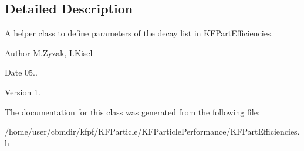 \subsection{Detailed Description}
A helper class to define parameters of the decay list in \hyperlink{classKFPartEfficiencies}{K\+F\+Part\+Efficiencies}. 

\begin{DoxyAuthor}{Author}
M.\+Zyzak, I.\+Kisel 
\end{DoxyAuthor}
\begin{DoxyDate}{Date}
05.. 
\end{DoxyDate}
\begin{DoxyVersion}{Version}
1. 
\end{DoxyVersion}


The documentation for this class was generated from the following file\+:\begin{DoxyCompactItemize}
\item 
/home/user/cbmdir/kfpf/\+K\+F\+Particle/\+K\+F\+Particle\+Performance/K\+F\+Part\+Efficiencies.\+h\end{DoxyCompactItemize}
